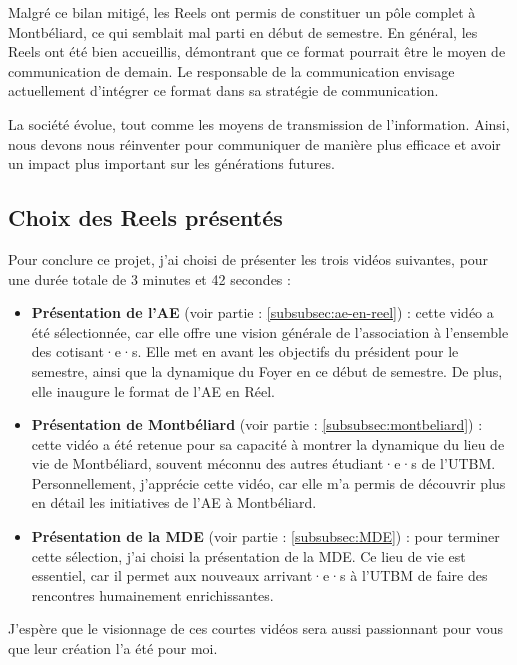 Malgré ce bilan mitigé, les Reels ont permis de constituer un pôle complet à Montbéliard, ce qui semblait mal parti en début de semestre.
En général, les Reels ont été bien accueillis, démontrant que ce format pourrait être le moyen de communication de demain.
Le responsable de la communication envisage actuellement d'intégrer ce format dans sa stratégie de communication.

La société évolue, tout comme les moyens de transmission de l'information.
Ainsi, nous devons nous réinventer pour communiquer de manière plus efficace et avoir un impact plus important sur les générations futures.


\subsection{Choix des Reels présentés}\label{subsec:choix-des-reels-presentes}

Pour conclure ce projet, j'ai choisi de présenter les trois vidéos suivantes, pour une durée totale de 3 minutes et 42 secondes :

\begin{itemize}
    \item \textbf{Présentation de l'\gls{AE}} (voir partie : \ref{subsubsec:ae-en-reel}) : cette vidéo a été sélectionnée, car elle offre une vision générale de l'association à l'ensemble des cotisant·e·s.
    Elle met en avant les objectifs du président pour le semestre, ainsi que la dynamique du Foyer en ce début de semestre.
    De plus, elle inaugure le format de l'\gls{AE} en Réel.
    \item \textbf{Présentation de Montbéliard} (voir partie : \ref{subsubsec:montbeliard}) : cette vidéo a été retenue pour sa capacité à montrer la dynamique du lieu de vie de Montbéliard, souvent méconnu des autres étudiant·e·s de l'\gls{UTBM}.
    Personnellement, j'apprécie cette vidéo, car elle m'a permis de découvrir plus en détail les initiatives de l'\gls{AE} à Montbéliard.
    \item \textbf{Présentation de la MDE} (voir partie : \ref{subsubsec:MDE}) : pour terminer cette sélection, j'ai choisi la présentation de la MDE. Ce lieu de vie est essentiel, car il permet aux nouveaux arrivant·e·s à l'\gls{UTBM} de faire des rencontres humainement enrichissantes.
\end{itemize}

J'espère que le visionnage de ces courtes vidéos sera aussi passionnant pour vous que leur création l'a été pour moi.